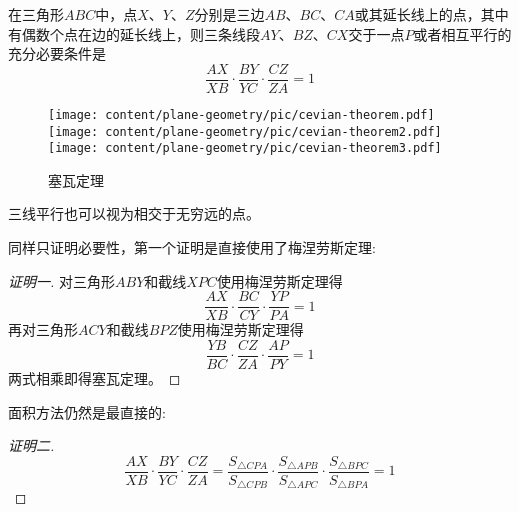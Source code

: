 \begin{theorem}[塞瓦定理]
  在三角形$ABC$中，点$X$、$Y$、$Z$分别是三边$AB$、$BC$、$CA$或其延长线上的点，其中有偶数个点在边的延长线上，则三条线段$AY$、$BZ$、$CX$交于一点$P$或者相互平行的充分必要条件是
  \begin{equation}
    \label{eq:cevian-theorem}
    \frac{AX}{XB} \cdot \frac{BY}{YC} \cdot \frac{CZ}{ZA} = 1
  \end{equation}
\end{theorem}
 
\begin{figure}[htbp]
\centering
\texttt{[image: content/plane-geometry/pic/cevian-theorem.pdf]}
\texttt{[image: content/plane-geometry/pic/cevian-theorem2.pdf]}
\texttt{[image: content/plane-geometry/pic/cevian-theorem3.pdf]}
\caption{塞瓦定理}
\label{fig:cevian-theorem}
\end{figure}

三线平行也可以视为相交于无穷远的点。

同样只证明必要性，第一个证明是直接使用了梅涅劳斯定理:
\begin{proof}[证明一]
  对三角形$ABY$和截线$XPC$使用梅涅劳斯定理得
  \begin{equation*}
    \frac{AX}{XB} \cdot \frac{BC}{CY} \cdot \frac{YP}{PA} = 1
  \end{equation*}
  再对三角形$ACY$和截线$BPZ$使用梅涅劳斯定理得
  \begin{equation*}
    \frac{YB}{BC} \cdot \frac{CZ}{ZA} \cdot \frac{AP}{PY} = 1
  \end{equation*}
  两式相乘即得塞瓦定理。
\end{proof}

面积方法仍然是最直接的:
\begin{proof}[证明二]
  \begin{equation*}
    \frac{AX}{XB} \cdot \frac{BY}{YC} \cdot \frac{CZ}{ZA} =
    \frac{S_{\triangle CPA}}{S_{\triangle CPB}} \cdot
    \frac{S_{\triangle APB}}{S_{\triangle APC}} \cdot
    \frac{S_{\triangle BPC}}{S_{\triangle BPA}} = 1
  \end{equation*}
\end{proof}


